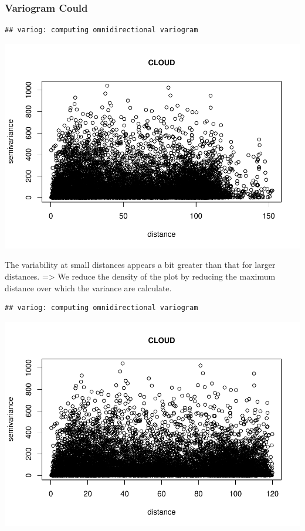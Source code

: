 \documentclass[
]{article}
\begin{document}
\hypertarget{variogram-could}{%
\subsubsection{Variogram Could}\label{variogram-could}}

\begin{verbatim}
## variog: computing omnidirectional variogram
\end{verbatim}

\includegraphics{Assignment_1_files/figure-latex/unnamed-chunk-12-1.pdf}

The variability at small distances appears a bit greater than that for
larger distances. =\textgreater{} We reduce the density of the plot by
reducing the maximum distance over which the variance are calculate.

\begin{verbatim}
## variog: computing omnidirectional variogram
\end{verbatim}

\includegraphics{Assignment_1_files/figure-latex/unnamed-chunk-13-1.pdf}
\end{document}
